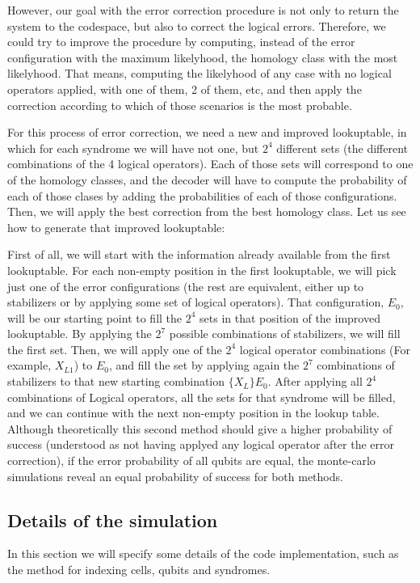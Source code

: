 \documentclass[a4paper,12pt]{article}
\begin{document}
However, our goal with the error correction procedure is not only to return the system to the codespace, but also to correct the logical errors. Therefore, we could try to improve the procedure by computing, instead of the error configuration with the maximum likelyhood, the homology class with the most likelyhood. That means, computing the likelyhood of any case with no logical operators applied, with one of them, 2 of them, etc, and then apply the correction according to which of those scenarios is the most probable.

For this process of error correction, we need a new and improved lookuptable, in which for each syndrome we will have not one, but $2^4$ different sets (the different combinations of the 4 logical operators). Each of those sets will correspond to one of the homology classes, and the decoder will have to compute the probability of each of those clases by adding the probabilities of each of those configurations. Then, we will apply the best correction from the best homology class. Let us see how to generate that improved lookuptable:

First of all, we will start with the information already available from the first lookuptable. For each non-empty position in the first lookuptable, we will pick just one of the error configurations (the rest are equivalent, either up to stabilizers or by applying some set of logical operators). That configuration, $E_0$, will be our starting point to fill the $2^4$ sets in that position of the improved lookuptable. By applying the $2^7$ possible combinations of stabilizers, we will fill the first set. Then, we will apply one of the $2^4$ logical operator combinations (For example, $X_{L1}$) to $E_0$, and fill the set by applying again the $2^7$ combinations of stabilizers to that new starting combination $\{X_L\}E_0$. After applying all $2^4$ combinations of Logical operators, all the sets for that syndrome will be filled, and we can continue with the next non-empty position in the lookup table.\\

Although theoretically this second method should give a higher probability of success (understood as not having applyed any logical operator after the error correction), if the error probability of all qubits are equal, the monte-carlo simulations reveal an equal probability of success for both methods.



\subsection{Details of the simulation}
In this section we will specify some details of the code implementation, such as the method for indexing cells, qubits and syndromes.
\end{document}
